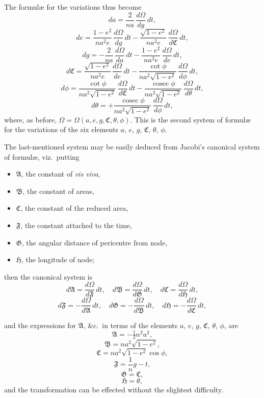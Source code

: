 \documentclass[11pt]{article}
\begin{document}
\bigskip
{} The formul\ae{} for the variations thus become
\[
da = \frac{2}{na}\,\frac{d\Omega}{dg}\,dt,
\]
\[
de = \frac{1-e^{2}}{na^{2}e}\,\frac{d\Omega}{dg}\,dt - \frac{\sqrt{1-e^{2}}}{na^{2}e}\,\frac{d\Omega}{d\mathfrak{C}}\,dt,
\]
\[
dg = -\frac{2}{na}\,\frac{d\Omega}{da}\,dt - \frac{1-e^{2}}{na^{2}e}\,\frac{d\Omega}{de}\,dt,
\]
\[
d\mathfrak{C} = \frac{\sqrt{1-e^{2}}}{na^{2}e}\,\frac{d\Omega}{de}\,dt - \frac{\cot\phi}{na^{2}\sqrt{1-e^{2}}}\,\frac{d\Omega}{d\phi}\,dt,
\]
\[
d\phi = \frac{\cot\phi}{na^{2}\sqrt{1-e^{2}}}\,\frac{d\Omega}{d\mathfrak{C}}\,dt - \frac{\operatorname{cosec}\phi}{na^{2}\sqrt{1-e^{2}}}\,\frac{d\Omega}{d\theta}\,dt,
\]
\[
d\theta = +\frac{\operatorname{cosec}\phi}{na^{2}\sqrt{1-e^{2}}}\,\frac{d\Omega}{d\phi}\,dt,
\]
where, as before, $\Omega = \Omega(a,e,g,\mathfrak{C},\theta,\phi)$. This is the second system of formul\ae{} for the variations of the six elements $a$, $e$, $g$, $\mathfrak{C}$, $\theta$, $\phi$.

\medskip
\noindent The last-mentioned system may be easily deduced from Jacobi's canonical system of formul\ae, viz.\ putting
\begin{itemize}
\item[] $\mathfrak{A}$, the constant of \emph{vis viva},
\item[] $\mathfrak{B}$, the constant of areas,
\item[] $\mathfrak{C}$, the constant of the reduced area,
\item[] $\mathfrak{F}$, the constant attached to the time,
\item[] $\mathfrak{G}$, the angular distance of pericentre from node,
\item[] $\mathfrak{H}$, the longitude of node;
\end{itemize}
then the canonical system is
\[
d\mathfrak{A} = \frac{d\Omega}{d\mathfrak{F}}\,dt,\quad d\mathfrak{B} = \frac{d\Omega}{d\mathfrak{G}}\,dt,\quad d\mathfrak{C} = \frac{d\Omega}{d\mathfrak{H}}\,dt,
\]
\[
d\mathfrak{F} = -\frac{d\Omega}{d\mathfrak{A}}\,dt,\quad d\mathfrak{G} = -\frac{d\Omega}{d\mathfrak{B}}\,dt,\quad d\mathfrak{H} = -\frac{d\Omega}{d\mathfrak{C}}\,dt,
\]

\bigskip
{} and the expressions for $\mathfrak{A}$, \&c.\ in terms of the elements $a$, $e$, $g$, $\mathfrak{C}$, $\theta$, $\phi$, are
\[
\mathfrak{A} = -\tfrac{1}{2}n^{2}a^{2},
\]
\[
\mathfrak{B} = na^{2}\sqrt{1-e^{2}},
\]
\[
\mathfrak{C} = na^{2}\sqrt{1-e^{2}}\cos\phi,
\]
\[
\mathfrak{F} = \frac{1}{n}g - t,
\]
\[
\mathfrak{G} = \mathfrak{C},
\]
\[
\mathfrak{H} = \theta,
\]
and the transformation can be effected without the slightest difficulty.
\end{document}
